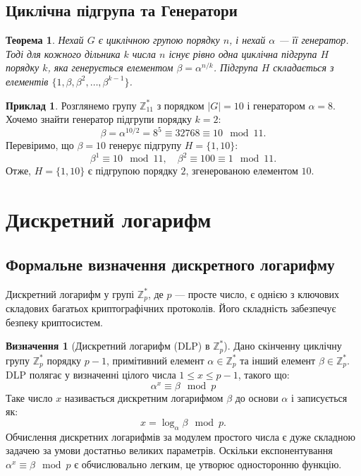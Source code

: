 \documentclass[12pt]{report}
\theoremstyle{definition}
\newtheorem{definition}{Визначення}[chapter]
\newtheorem{example}{Приклад}[chapter]
\theoremstyle{plain}
\newtheorem{theorem}{Теорема}[chapter]
\begin{document}
\subsection{Циклічна підгрупа та Генератори}

\begin{theorem}
Нехай \( G \) є циклічною групою порядку \( n \), і нехай \( \alpha \) — її генератор. Тоді для кожного дільника \( k \) числа \( n \) існує рівно одна циклічна підгрупа \( H \) порядку \( k \), яка генерується елементом \( \beta = \alpha^{n/k} \). Підгрупа \( H \) складається з елементів \( \{1, \beta, \beta^2, \ldots, \beta^{k-1}\} \).
\end{theorem}

\begin{example}
Розглянемо групу \( \mathbb{Z}^*_{11} \) з порядком \( |G| = 10 \) і генератором \( \alpha = 8 \). Хочемо знайти генератор підгрупи порядку \( k = 2 \):
\[
\beta = \alpha^{10/2} = 8^5 \equiv 32768 \equiv 10 \mod 11.
\]
Перевіримо, що \( \beta = 10 \) генерує підгрупу \( H = \{1, 10\} \):
\[
\beta^1 \equiv 10 \mod 11, \quad \beta^2 \equiv 100 \equiv 1 \mod 11.
\]
Отже, \( H = \{1, 10\} \) є підгрупою порядку \( 2 \), згенерованою елементом \( 10 \).
\end{example}

\section{Дискретний логарифм}

\subsection{Формальне визначення дискретного логарифму}

Дискретний логарифм у групі \( \mathbb{Z}^*_p \), де \( p \) — просте число, є однією з ключових складових багатьох криптографічних протоколів. Його складність забезпечує безпеку криптосистем.

\begin{definition}[Дискретний логарифм (DLP) в \( \mathbb{Z}^*_p \)]
Дано скінченну циклічну групу \( \mathbb{Z}^*_p \) порядку \( p - 1 \), примітивний елемент \( \alpha \in \mathbb{Z}^*_p \) та інший елемент \( \beta \in \mathbb{Z}^*_p \). DLP полягає у визначенні цілого числа \( 1 \leq x \leq p - 1 \), такого що:
\[
\alpha^x \equiv \beta \mod p
\]
Таке число \( x \) називається дискретним логарифмом \( \beta \) до основи \( \alpha \) і записується як:
\[
x = \log_\alpha \beta \mod p.
\]
Обчислення дискретних логарифмів за модулем простого числа є дуже складною задачею за умови достатньо великих параметрів. Оскільки експонентування \( \alpha^x \equiv \beta \mod p \) є обчислювально легким, це утворює односторонню функцію.
\end{definition}
\end{document}
